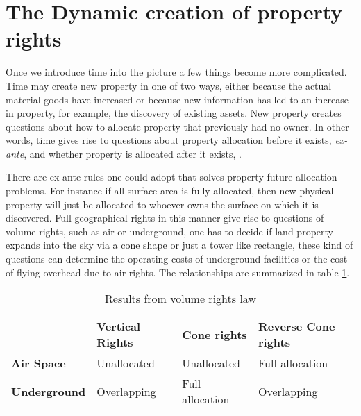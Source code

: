 \documentclass[12pt]{article}
\numberwithin{equation}{section}
\begin{document}
\newpage

\section{The Dynamic creation of property rights}

Once we introduce time into the picture a few things become more complicated. Time may create new property in one of two ways, either because the actual material goods have increased or because new information has led to an increase in property, for example, the discovery of existing assets. New property creates questions about how to allocate property that previously had no owner. In other words, time gives rise to questions about property allocation before it exists, \textit{ex-ante}, and whether property is allocated after it exists, .

There are ex-ante rules one could adopt that solves property future allocation problems.  For instance if all surface area is fully allocated, then new physical property will just be allocated to whoever owns the surface on which it is discovered. Full geographical rights in this manner give rise to questions of volume rights, such as air or underground, one has to decide if land property expands into the sky via a cone shape or just a tower like rectangle, these kind of questions can determine the operating costs of underground facilities or the cost of flying overhead due to air rights. The relationships are summarized in table \ref{Volume}.

\begin{table}[t]
\begin{tabular}{|l|l|l|l|}
\hline
                     & \textbf{Vertical Rights}       & \textbf{Cone rights}          & \textbf{Reverse Cone rights}  \\ \hline
\textbf{Air Space}   & Unallocated             & Unallocated            & Full allocation \\ \hline
\textbf{Underground} & Overlapping & Full allocation & Overlapping       \\ \hline
\end{tabular}
\caption{Results from volume rights law}
\label{Volume}
\end{table}
\end{document}

